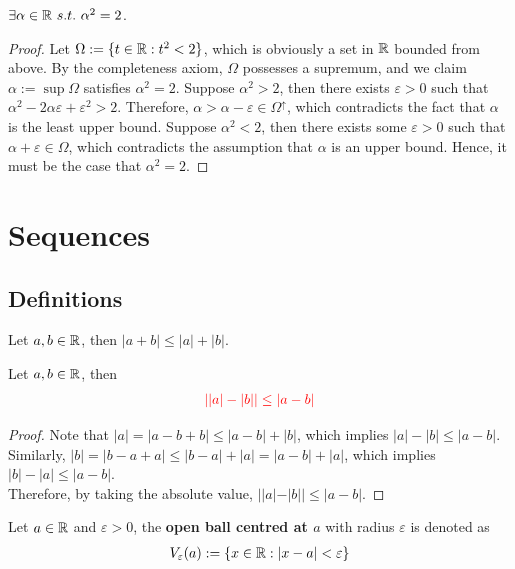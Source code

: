 \documentclass[11pt]{article}
\begin{document}
	\begin{theorem}
		$\exists \alpha \in \mathbb{R}\ s.t.\ \alpha^2 = 2$.
	\end{theorem}
	
	\begin{proof}
		Let $\Omega := \{t \in \mathbb{R}: t^2 < 2\}$, which is obviously a set in $\mathbb{R}$ bounded from above. By the completeness axiom, $\Omega$ possesses a supremum, and we claim $\alpha := \sup \Omega$ satisfies $\alpha^2 = 2$. Suppose $\alpha^2 > 2$, then there exists $\varepsilon > 0$ such that $\alpha^2 - 2 \alpha \varepsilon + \varepsilon^2 > 2$. Therefore, $\alpha > \alpha - \varepsilon \in \Omega^\uparrow$, which contradicts the fact that $\alpha$ is the least upper bound. Suppose $\alpha^2 < 2$, then there exists some $\varepsilon > 0$ such that $\alpha + \varepsilon \in \Omega$, which contradicts the assumption that $\alpha$ is an upper bound. Hence, it must be the case that $\alpha^2 = 2$.
	\end{proof}
	
	\section{Sequences}
	\subsection{Definitions}
	\begin{theorem}
		Let $a, b \in \mathbb{R}$, then $|a + b| \leq |a| + |b|$.
	\end{theorem}
	
	\begin{corollary}
		Let $a, b \in \mathbb{R}$, then
		\begin{align}
			\textcolor{red}{| |a| - |b| | \leq |a - b|}
		\end{align}
	\end{corollary}
	
	\begin{proof}
		Note that $|a| = |a - b + b| \leq |a - b| + |b|$, which implies $|a| - |b| \leq |a - b|$. \\
		Similarly, $|b| = |b - a + a| \leq |b - a| + |a| = |a - b| + |a|$, which implies $|b| - |a| \leq |a - b|$. \\
		Therefore, by taking the absolute value, $||a| - |b|| \leq |a - b|$.
	\end{proof}

	\begin{definition}
		Let $a \in \mathbb{R}$ and $\varepsilon > 0$, the \textbf{open ball centred at $a$} with radius $\varepsilon$ is denoted as 
	\begin{align}
		V_\varepsilon(a) := \left\{x \in \mathbb{R} : |x - a| < \varepsilon \right\}
	\end{align}
	\end{definition}
\end{document}
